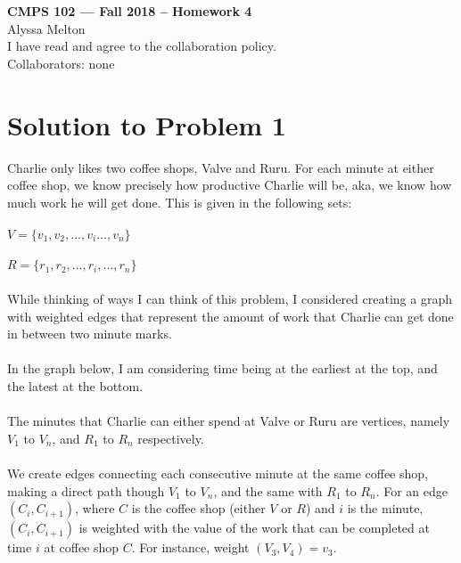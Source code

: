 \documentclass[11pt]{article}
\begin{document}
	\begin{center}
		{\bf\Large CMPS 102 --- Fall 2018 --  Homework 4}\\
		Alyssa Melton\\
		I have read and agree to the collaboration policy. \\
		Collaborators: none\\
	\end{center}


	\section*{Solution to Problem 1}
		Charlie only likes two coffee shops, Valve and Ruru. For each minute at either coffee shop, we know precisely how productive Charlie will be, aka, we know how much work he will get done. This is given in the following sets:\\
		\\
		$V=\{v_1, v_2, . . . , v_i. . . , v_n\}$\\
		\\
		$R=\{r_1, r_2, . . . , r_i, . . . , r_n\}$\\
		\\
		While thinking of ways I can think of this problem, I considered creating a graph with weighted edges that represent the amount of work that Charlie can get done in between two minute marks.\\
		\\
		In the graph below, I am considering time being at the earliest at the top, and the latest at the bottom.\\
		\\
		The minutes that Charlie can either spend at Valve or Ruru are vertices, namely $V_1$ to $V_n$, and $R_1$ to $R_n$ respectively.\\
		\\
		We create edges connecting each consecutive minute at the same coffee shop, making a direct path though $V_1$ to $V_n$, and the same with $R_1$ to $R_n$. For an edge $(C_i, C_{i+1})$, where $C$ is the coffee shop (either $V$ or $R$) and $i$ is the minute, $(C_i, C_{i+1})$ is weighted with the value of the work that can be completed at time $i$ at coffee shop $C$. For instance, weight $(V_3, V_4) = v_3$.\\
		\\
\end{document}

